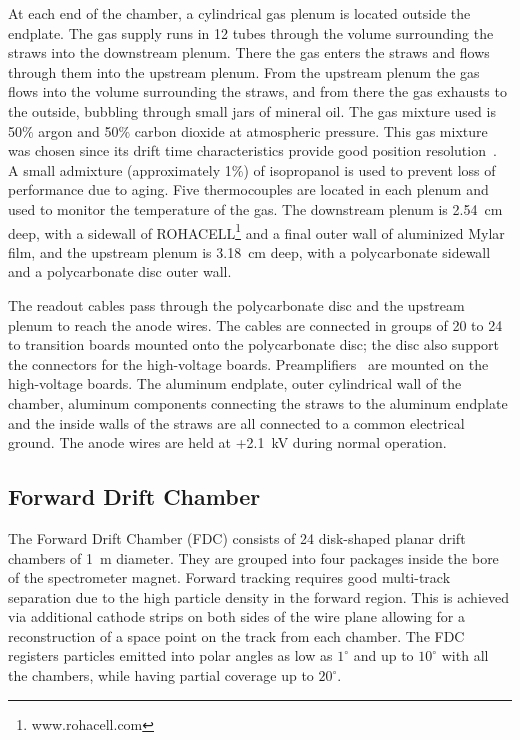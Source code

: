 At each end of the chamber, a cylindrical gas plenum is located outside the endplate.  
The gas supply runs in 12 tubes through the volume surrounding the straws into the downstream plenum. 
There the gas enters the straws and flows through them into the upstream plenum. From the upstream plenum the gas flows into the volume surrounding the straws, and from there the gas exhausts to the outside, bubbling through small jars of mineral oil.
The gas mixture used is 50$\%$ argon and 50$\%$ carbon dioxide at atmospheric pressure. 
This gas mixture was chosen since its drift time characteristics provide good position resolution~\cite{VanHaarlem:2010yq}.
A small admixture (approximately 1$\%$) of isopropanol is used to prevent loss of performance due to aging\cite{KADYK1991436,VAVRA20031}. 
Five thermocouples are located in each plenum and used to monitor the temperature of the gas.
The downstream plenum is 2.54~cm deep, with a sidewall of ROHACELL\footnote{www.rohacell.com} and a final outer wall of aluminized Mylar film, and the upstream plenum is 3.18~cm deep, with a polycarbonate sidewall and a polycarbonate disc outer wall. 

The readout cables pass through the polycarbonate disc and the upstream plenum to reach the anode wires. 
The cables are connected in groups of 20 to 24 to transition boards mounted onto the polycarbonate disc; the disc also support the connectors for the high-voltage boards. 
Preamplifiers~\cite{hdnote2515} are mounted on the high-voltage boards. The aluminum endplate, outer cylindrical wall of the chamber, aluminum components connecting the straws to the aluminum endplate and the inside walls of the straws are all connected to a common electrical ground. 
The anode wires are held at +2.1~kV during normal operation. 


\subsection[Forward Drift Chamber]{Forward Drift Chamber
\label{sec:fdc} }

The Forward Drift Chamber (FDC) consists of 24 disk-shaped planar drift chambers of 1~m diameter.
They are grouped into four packages inside the bore of the spectrometer magnet.
Forward tracking requires good multi-track separation due to the
high particle density in the forward region.
This is achieved via additional cathode strips on both sides of the wire plane allowing for a  reconstruction of a space point on the track from each chamber. 
The FDC registers particles emitted into polar angles as low as $1^\circ$ and up to $10^\circ $
with all the chambers, while having partial coverage up to $20^\circ$.

